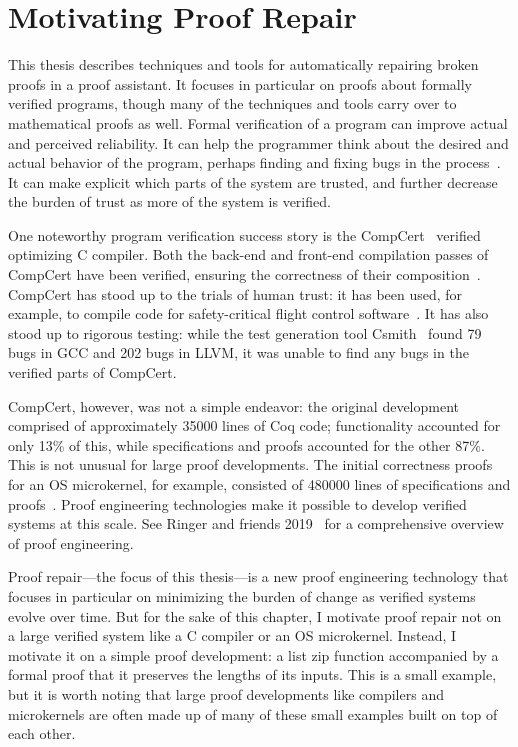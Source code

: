 \chapter{Motivating Proof Repair}

This thesis describes techniques and tools for automatically repairing broken proofs in a proof assistant.
It focuses in particular on proofs about formally verified programs, though many of the techniques and tools carry over to mathematical proofs as well.
Formal verification of a program can improve actual and perceived reliability. %
It can help the programmer think about the desired and actual behavior of the program,
perhaps finding and fixing bugs in the process~\cite{murraybp}.
It can make explicit which parts of the system are trusted, and further decrease the burden
of trust as more of the system is verified.

One noteworthy program verification success story is the CompCert~\cite{Leroy:POPL06, Leroy2009} verified optimizing C compiler.
Both the back-end and front-end compilation passes
of CompCert have been verified, ensuring the correctness of their composition~\cite{Kaestner2017}.
CompCert has stood up to the trials of human trust: it has been used, for example, to compile code for safety-critical flight control software~\cite{Frana2011}.
It has also stood up to rigorous testing: while the test generation tool Csmith~\cite{Yang2011} found 
79 bugs in GCC and 202 bugs in LLVM, it was unable to find any bugs in the verified parts of CompCert.

CompCert, however, was not a simple endeavor: the original development comprised of approximately 35000 lines of Coq code;
functionality accounted for only 13\% of this, while specifications and proofs accounted for the other 87\%.
This is not unusual for large proof developments. The initial correctness proofs for an OS microkernel,
for example, consisted of 480000 lines of specifications and proofs~\cite{Klein2014micro}.
Proof engineering technologies make it possible to develop verified systems at this scale.
See Ringer and friends 2019~\cite{PGL-045} for a comprehensive overview of proof engineering.

Proof repair---the focus of this thesis---is a new proof engineering technology that focuses in particular on minimizing the burden of change as verified systems evolve over time.
But for the sake of this chapter, I motivate proof repair not on a large verified system like a C compiler or an OS microkernel.
Instead, I motivate it on a simple proof development: a list zip function accompanied by a formal proof that it preserves the lengths of its inputs.
This is a small example, but it is worth noting that large proof developments like compilers and microkernels
are often made up of many of these small examples built on top of each other.

